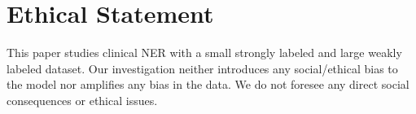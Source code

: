 \documentclass[letterpaper]{article} %
\begin{document}
\section{Ethical Statement}
\label{ethics}
%
This paper studies clinical NER with a small strongly labeled and large weakly labeled dataset.
Our investigation neither introduces any social/ethical bias to the model nor amplifies any bias in the data.
We do not foresee any direct social consequences or ethical issues.
%
%
%
\end{document}
